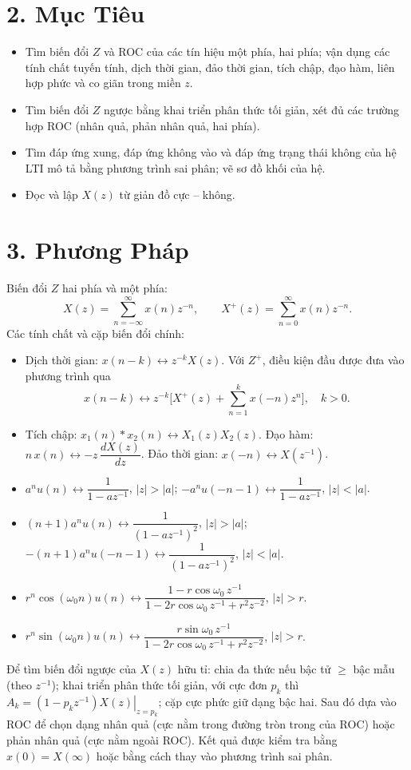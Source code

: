\documentclass[12pt,a4paper]{article}
\begin{document}
\section*{2. Mục Tiêu}
\begin{itemize}
    \item Tìm biến đổi $Z$ và ROC của các tín hiệu một phía, hai phía; vận dụng các tính chất tuyến tính, dịch thời gian, đảo thời gian, tích chập, đạo hàm, liên hợp phức và co giãn trong miền $z$.
    \item Tìm biến đổi $Z$ ngược bằng khai triển phân thức tối giản, xét đủ các trường hợp ROC (nhân quả, phản nhân quả, hai phía).
    \item Tìm đáp ứng xung, đáp ứng không vào và đáp ứng trạng thái không của hệ LTI mô tả bằng phương trình sai phân; vẽ sơ đồ khối của hệ.
    \item Đọc và lập $X(z)$ từ giản đồ cực -- không.
\end{itemize}

\section*{3. Phương Pháp}
Biến đổi $Z$ hai phía và một phía:
\[
X(z)=\sum_{n=-\infty}^{\infty}x(n)z^{-n},\qquad X^{+}(z)=\sum_{n=0}^{\infty}x(n)z^{-n}.
\]
Các tính chất và cặp biến đổi chính:
\begin{itemize}
    \item Dịch thời gian: $x(n-k)\leftrightarrow z^{-k}X(z)$. Với $Z^{+}$, điều kiện đầu được đưa vào phương trình qua
    \[ x(n-k)\leftrightarrow z^{-k}\Big[X^{+}(z)+\sum_{n=1}^{k}x(-n)z^{n}\Big],\quad k>0. \]
    \item Tích chập: $x_1(n)*x_2(n)\leftrightarrow X_1(z)X_2(z)$. Đạo hàm: $n\,x(n)\leftrightarrow -z\,\dfrac{dX(z)}{dz}$. Đảo thời gian: $x(-n)\leftrightarrow X(z^{-1})$.
    \item $a^nu(n)\leftrightarrow\dfrac{1}{1-az^{-1}}$, $|z|>|a|$; \quad $-a^nu(-n-1)\leftrightarrow\dfrac{1}{1-az^{-1}}$, $|z|<|a|$.
    \item $(n+1)a^nu(n)\leftrightarrow\dfrac{1}{(1-az^{-1})^2}$, $|z|>|a|$; \quad $-(n+1)a^nu(-n-1)\leftrightarrow\dfrac{1}{(1-az^{-1})^2}$, $|z|<|a|$.
    \item $r^n\cos(\omega_0n)u(n)\leftrightarrow\dfrac{1-r\cos\omega_0\,z^{-1}}{1-2r\cos\omega_0\,z^{-1}+r^2z^{-2}}$, $|z|>r$.
    \item $r^n\sin(\omega_0n)u(n)\leftrightarrow\dfrac{r\sin\omega_0\,z^{-1}}{1-2r\cos\omega_0\,z^{-1}+r^2z^{-2}}$, $|z|>r$.
\end{itemize}
Để tìm biến đổi ngược của $X(z)$ hữu tỉ: chia đa thức nếu bậc tử $\ge$ bậc mẫu (theo $z^{-1}$); khai triển phân thức tối giản, với cực đơn $p_k$ thì $A_k=\left.(1-p_kz^{-1})X(z)\right|_{z=p_k}$; cặp cực phức giữ dạng bậc hai. Sau đó dựa vào ROC để chọn dạng nhân quả (cực nằm trong đường tròn trong của ROC) hoặc phản nhân quả (cực nằm ngoài ROC). Kết quả được kiểm tra bằng $x(0)=X(\infty)$ hoặc bằng cách thay vào phương trình sai phân.
\end{document}
